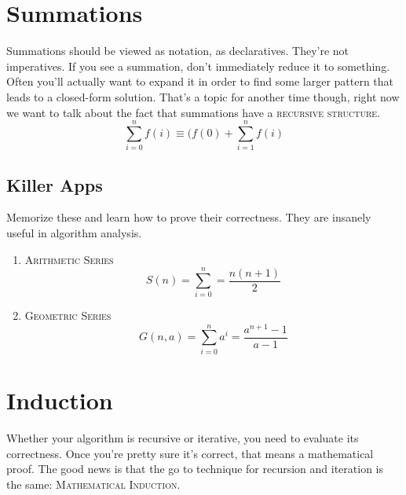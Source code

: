 \documentclass[]{tufte-handout}
\begin{document}
\section{Summations}

Summations should be viewed as notation, as declaratives. They're not imperatives. If you see a summation, don't immediately reduce it to something.  Often you'll actually want to expand it in order to find some larger pattern that leads to a closed-form solution. That's a topic for another time though, right now we want to talk about the fact that summations have a \textsc{recursive structure}.   
\begin{equation*}
\sum\limits_{i=0}^{n}f(i) \equiv (f(0) + \sum\limits_{i=1}^{n}f(i)
\end{equation*}

\subsection{Killer Apps}

Memorize these and learn how to prove their correctness. They are insanely useful in algorithm analysis. 
\begin{enumerate}
\item \textsc{Arithmetic Series}
\begin{equation}
S(n) = \sum\limits_{i=0}^{n} = \dfrac{n(n+1)}{2}
\end{equation}
\item \textsc{Geometric Series}
\begin{equation}
G(n,a) = \sum\limits_{i=0}^{n}a^i = \dfrac{a^{n+1}-1}{a-1}
\end{equation}
\end{enumerate}

\section{Induction}

Whether your algorithm is recursive or iterative, you need to evaluate its correctness. Once you're pretty sure it's correct, that means a mathematical proof.  The good news is that the go to technique for recursion and iteration is the same: \textsc{Mathematical Induction}. 
\end{document}
